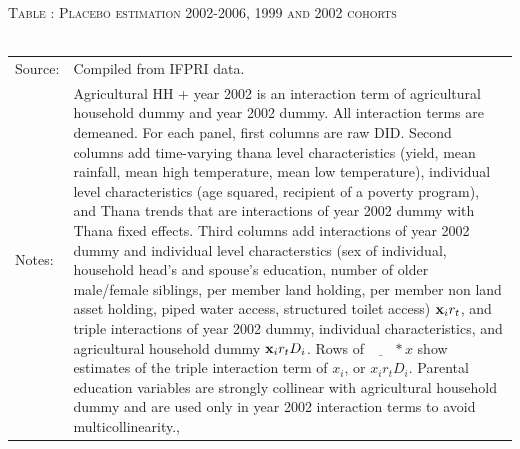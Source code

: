\documentclass[12pt,letterpaper]{article}
\newcommand{\bfx}{\ensuremath{\mbox{\bf x}}}
\newcommand{\0}{\ensuremath{\mbox{\boldmath $0$}}}
\begin{document}
{\begin{table}\hfil\textsc{\footnotesize Table \thetable: Placebo estimation 2002-2006, 1999 and 2002 cohorts\label{zEm.1999.10.sameN}}\\\setlength{\tabcolsep}{.5pt}\renewcommand{\arraystretch}{.675}\hspace{-2em}\hfil\\\renewcommand{\arraystretch}{1}\hfil\begin{tabular}{>{\hfill\scriptsize}p{1cm}<{}>{\scriptsize}p{12cm}<{\hfill}} Source:& Compiled from IFPRI data. \\[-1ex] Notes:&   \textsf{Agricultural HH + year 2002} is an interaction term of agricultural household dummy and year 2002 dummy. All interaction terms are demeaned. For each panel, first columns are raw DID. Second columns add time-varying thana level characteristics (yield, mean rainfall, mean high temperature, mean low temperature), individual level characteristics (age squared, recipient of a poverty program), and \textsf{Thana trends} that are interactions of year 2002 dummy with Thana fixed effects. Third columns add interactions of year 2002 dummy and individual level characterstics (sex of individual, household head's and spouse's education, number of older male/female siblings, per member land holding, per member non land asset holding, piped water access, structured toilet access) $\bfx_{i}r_{t}$, and triple interactions of year 2002 dummy, individual characteristics, and agricultural household dummy $\bfx_{i}r_{t}D_{i}$. Rows of $\underline{\phantom{mm}}*x$ show estimates of the triple interaction term of $x_{i}$, or $x_{i}r_{t}D_{i}$. Parental education variables are strongly collinear with agricultural household dummy and are used only in year 2002 interaction terms to avoid multicollinearity., \\   \end{tabular} \end{table}



}
\end{document}
